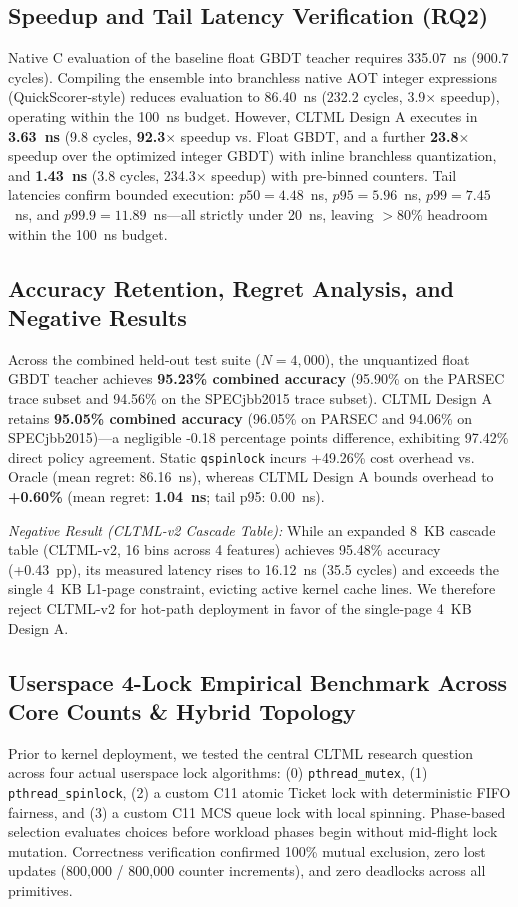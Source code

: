 \documentclass[conference]{IEEEtran}
\begin{document}
\subsection{Speedup and Tail Latency Verification (RQ2)}
Native C evaluation of the baseline float GBDT teacher requires 335.07~ns (900.7 cycles). Compiling the ensemble into branchless native AOT integer expressions (QuickScorer-style) reduces evaluation to 86.40~ns (232.2 cycles, 3.9$\times$ speedup), operating within the 100~ns budget. However, CLTML Design A executes in \textbf{3.63~ns} (9.8 cycles, \textbf{92.3$\times$} speedup vs. Float GBDT, and a further \textbf{23.8$\times$} speedup over the optimized integer GBDT) with inline branchless quantization, and \textbf{1.43~ns} (3.8 cycles, 234.3$\times$ speedup) with pre-binned counters. Tail latencies confirm bounded execution: $p50 = 4.48$~ns, $p95 = 5.96$~ns, $p99 = 7.45$~ns, and $p99.9 = 11.89$~ns---all strictly under 20~ns, leaving $>80\%$ headroom within the 100~ns budget.

\subsection{Accuracy Retention, Regret Analysis, and Negative Results}
Across the combined held-out test suite ($N=4{,}000$), the unquantized float GBDT teacher achieves \textbf{95.23\% combined accuracy} (95.90\% on the PARSEC trace subset and 94.56\% on the SPECjbb2015 trace subset). CLTML Design A retains \textbf{95.05\% combined accuracy} (96.05\% on PARSEC and 94.06\% on SPECjbb2015)---a negligible -0.18 percentage points difference, exhibiting 97.42\% direct policy agreement. Static \texttt{qspinlock} incurs +49.26\% cost overhead vs. Oracle (mean regret: 86.16~ns), whereas CLTML Design A bounds overhead to \textbf{+0.60\%} (mean regret: \textbf{1.04~ns}; tail p95: 0.00~ns).

\textit{Negative Result (CLTML-v2 Cascade Table):} While an expanded 8~KB cascade table (CLTML-v2, 16 bins across 4 features) achieves 95.48\% accuracy (+0.43~pp), its measured latency rises to 16.12~ns (35.5 cycles) and exceeds the single 4~KB L1-page constraint, evicting active kernel cache lines. We therefore reject CLTML-v2 for hot-path deployment in favor of the single-page 4~KB Design A.

\subsection{Userspace 4-Lock Empirical Benchmark Across Core Counts \& Hybrid Topology}
Prior to kernel deployment, we tested the central CLTML research question across four actual userspace lock algorithms: (0) \texttt{pthread\_mutex}, (1) \texttt{pthread\_spinlock}, (2) a custom C11 atomic Ticket lock with deterministic FIFO fairness, and (3) a custom C11 MCS queue lock with local spinning. Phase-based selection evaluates choices before workload phases begin without mid-flight lock mutation. Correctness verification confirmed 100\% mutual exclusion, zero lost updates (800,000 / 800,000 counter increments), and zero deadlocks across all primitives.
\end{document}
